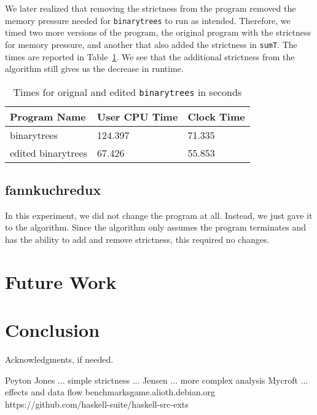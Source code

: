 \documentclass{sigplanconf}
\begin{document}
We later realized that removing the strictness from the program removed the memory pressure needed for \lstinline!binarytrees! to run as intended. Therefore, we timed two more versions of the program, the original program with the strictness for memory pressure, and another that also added the strictness in \lstinline!sumT!. The times are reported in Table~\ref{tab:btree}. We see that the additional strictness from the algorithm still gives us the decrease in runtime.
\begin{table}[t]
\label{tab:btree}
\begin{tabular}{| l | l | l |}
\hline
Program Name & User CPU Time & Clock Time\\
\hline
binarytrees & 124.397 & 71.335\\
\hline
edited binarytrees & 67.426 & 55.853\\
\hline
\end{tabular}
\caption{Times for orignal and edited \lstinline!binarytrees! in seconds}
\end{table}
\subsection{fannkuchredux}
In this experiment, we did not change the program at all. Instead, we just gave it to the algorithm. Since the algorithm only assumes the program terminates and has the ability to add and remove strictness, this required no changes.
\section{Future Work}\label{sec:futr}

\section{Conclusion}\label{sec:conc}

%

\acks

Acknowledgments, if needed.





\begin{thebibliography}{}
\softraggedright

Peyton Jones ... simple strictness ...
Jensen ... more complex analysis
Mycroft ... effects and data flow
benchmarksgame.alioth.debian.org
https://github.com/haskell-suite/haskell-src-exts
\end{thebibliography}
\end{document}
